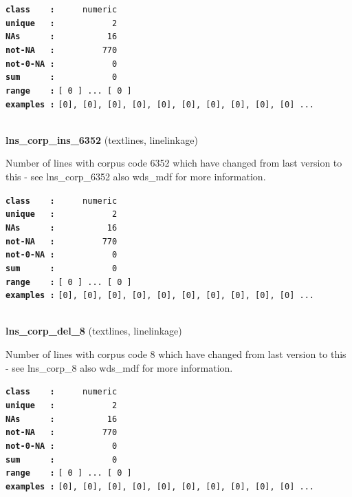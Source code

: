 \documentclass[]{article}
\begin{document}
\textbf{\texttt{class\ \ \ \ :}} \texttt{~~~~~numeric}\\
\textbf{\texttt{unique\ \ \ :}} \texttt{~~~~~~~~~~~2}\\
\textbf{\texttt{NAs\ \ \ \ \ \ :}} \texttt{~~~~~~~~~~16}\\
\textbf{\texttt{not-NA\ \ \ :}} \texttt{~~~~~~~~~770}\\
\textbf{\texttt{not-0-NA\ :}} \texttt{~~~~~~~~~~~0}\\
\textbf{\texttt{sum\ \ \ \ \ \ :}} \texttt{~~~~~~~~~~~0}\\
\textbf{\texttt{range\ \ \ \ :}}
\texttt{{[}\ 0\ {]}\ ...\ {[}\ 0\ {]}}\\
\textbf{\texttt{examples\ :}}
\texttt{{[}0{]},\ {[}0{]},\ {[}0{]},\ {[}0{]},\ {[}0{]},\ {[}0{]},\ {[}0{]},\ {[}0{]},\ {[}0{]},\ {[}0{]}\ ...}\\

~

\textbf{lns\_corp\_ins\_6352} (textlines, linelinkage)

Number of lines with corpus code 6352 which have changed from last
version to this - see lns\_corp\_6352 also wds\_mdf for more
information.

\textbf{\texttt{class\ \ \ \ :}} \texttt{~~~~~numeric}\\
\textbf{\texttt{unique\ \ \ :}} \texttt{~~~~~~~~~~~2}\\
\textbf{\texttt{NAs\ \ \ \ \ \ :}} \texttt{~~~~~~~~~~16}\\
\textbf{\texttt{not-NA\ \ \ :}} \texttt{~~~~~~~~~770}\\
\textbf{\texttt{not-0-NA\ :}} \texttt{~~~~~~~~~~~0}\\
\textbf{\texttt{sum\ \ \ \ \ \ :}} \texttt{~~~~~~~~~~~0}\\
\textbf{\texttt{range\ \ \ \ :}}
\texttt{{[}\ 0\ {]}\ ...\ {[}\ 0\ {]}}\\
\textbf{\texttt{examples\ :}}
\texttt{{[}0{]},\ {[}0{]},\ {[}0{]},\ {[}0{]},\ {[}0{]},\ {[}0{]},\ {[}0{]},\ {[}0{]},\ {[}0{]},\ {[}0{]}\ ...}\\

~

\textbf{lns\_corp\_del\_8} (textlines, linelinkage)

Number of lines with corpus code 8 which have changed from last version
to this - see lns\_corp\_8 also wds\_mdf for more information.

\textbf{\texttt{class\ \ \ \ :}} \texttt{~~~~~numeric}\\
\textbf{\texttt{unique\ \ \ :}} \texttt{~~~~~~~~~~~2}\\
\textbf{\texttt{NAs\ \ \ \ \ \ :}} \texttt{~~~~~~~~~~16}\\
\textbf{\texttt{not-NA\ \ \ :}} \texttt{~~~~~~~~~770}\\
\textbf{\texttt{not-0-NA\ :}} \texttt{~~~~~~~~~~~0}\\
\textbf{\texttt{sum\ \ \ \ \ \ :}} \texttt{~~~~~~~~~~~0}\\
\textbf{\texttt{range\ \ \ \ :}}
\texttt{{[}\ 0\ {]}\ ...\ {[}\ 0\ {]}}\\
\textbf{\texttt{examples\ :}}
\texttt{{[}0{]},\ {[}0{]},\ {[}0{]},\ {[}0{]},\ {[}0{]},\ {[}0{]},\ {[}0{]},\ {[}0{]},\ {[}0{]},\ {[}0{]}\ ...}\\
\end{document}
